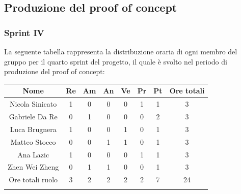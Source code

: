 %
\newpage
\subsection{Produzione del proof of concept}

\subsubsection{Sprint IV}
%
La seguente tabella rappresenta la distribuzione oraria di ogni membro del gruppo per il quarto sprint del progetto, il quale è svolto nel periodo di produzione del proof of concept:

	\setlength\extrarowheight{5pt}
	\begin{tabularx}{\textwidth}{|ccccccc|c|}
		\hline
		\rowcolor{white}
		\textbf{Nome} & \textbf{Re} & \textbf{Am} & \textbf{An} & \textbf{Ve} & \textbf{Pr}& \textbf{Pt} & \textbf{Ore totali} \\
		\hline
		Nicola Sinicato &1&0&0&0&1&1&3 \\
		Gabriele Da Re &0&1&0&0&0&2&3 \\
		Luca Brugnera &1&0&0&1&0&1&3 \\
		Matteo Stocco &0&0&1&1&0&1&3 \\
		Ana Lazic &1&0&0&0&1&1&3 \\
		Zhen Wei Zheng &0&1&1&0&0&1&3 \\
		\hline
		Ore totali ruolo &3&2&2&2&2&7&24 \\
		\hline
		\rowcolor{white}
		\caption{Distribuzione oraria durante il quarto sprint per ruolo e persona}
	\end{tabularx}
	\vspace{10pt}
	
